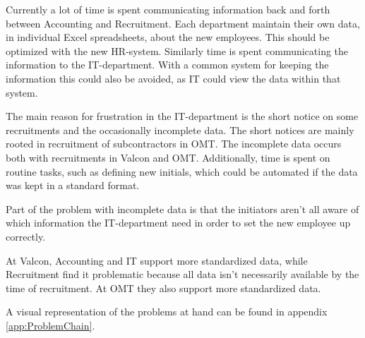 Currently a lot of time is spent communicating information back and forth between Accounting and Recruitment. 
Each department maintain their own data, in individual Excel spreadsheets, about the new employees. 
This should be optimized with the new HR-system.
Similarly time is spent communicating the information to the IT-department.
With a common system for keeping the information this could also be avoided, as IT could view the data within that system.

The main reason for frustration in the IT-department is the short notice on some recruitments and the occasionally incomplete data.
The short notices are mainly rooted in recruitment of subcontractors in OMT.
The incomplete data occurs both with recruitments in Valcon and OMT.
Additionally, time is spent on routine tasks, such as defining new initials, which could be automated if the data was kept in a standard format.

Part of the problem with incomplete data is that the initiators aren't all aware of which information the IT-department need in order to set the new employee up correctly.

At Valcon, Accounting and IT support more standardized data, while Recruitment find it problematic because all data isn't necessarily available by the time of recruitment.
At OMT they also support more standardized data.

A visual representation of the problems at hand can be found in appendix \ref{app:ProblemChain}.